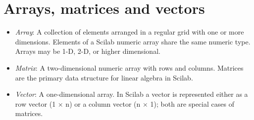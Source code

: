 \section{Arrays, matrices and vectors}
	\begin{itemize}
		\item \textit{Array}: A collection of elements arranged in a regular grid with one or more dimensions. Elements of a Scilab numeric array share the same numeric type. Arrays may be 1-D, 2-D, or higher dimensional.
		
		\item \textit{Matrix}: A two-dimensional numeric array with rows and columns. Matrices are the primary data structure for linear algebra in Scilab.
		
		\item \textit{Vector}: A one-dimensional array. In Scilab a vector is represented either as a row vector (1 × n) or a column vector (n × 1); both are special cases of matrices.
	\end{itemize}